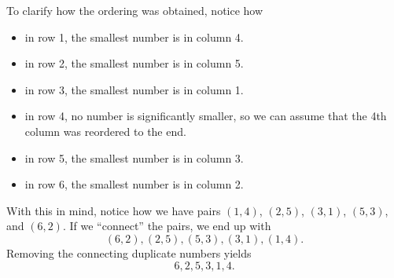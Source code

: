 \documentclass[letterpaper]{article}
\begin{document}
\begin{mdframed}
    To clarify how the ordering was obtained, notice how 
    \begin{itemize}
        \item in row 1, the smallest number is in column 4.
        \item in row 2, the smallest number is in column 5.
        \item in row 3, the smallest number is in column 1.
        \item in row 4, no number is significantly smaller, so we can assume that the 4th column was reordered to the end. 
        \item in row 5, the smallest number is in column 3.
        \item in row 6, the smallest number is in column 2.
    \end{itemize}
    With this in mind, notice how we have pairs $(1, 4)$, $(2, 5)$, $(3, 1)$, $(5, 3)$, and $(6, 2)$. If we ``connect'' the pairs, we end up with 
    \[(6, 2), (2, 5), (5, 3), (3, 1), (1, 4).\]
    Removing the connecting duplicate numbers yields 
    \[6, 2, 5, 3, 1, 4.\]
\end{mdframed}
\end{document}
